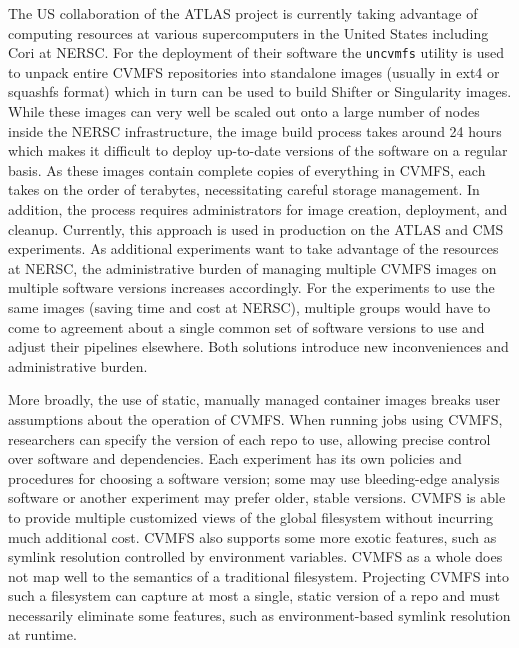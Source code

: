 \documentclass[sigconf]{acmart}
\begin{document}
The US collaboration of the ATLAS project is currently taking advantage of computing resources at various supercomputers in the United States including Cori at NERSC.
For the deployment of their software the \texttt{uncvmfs} utility is used to unpack entire CVMFS repositories into standalone images (usually in ext4 or squashfs format) which in turn can be used to build Shifter or Singularity images.
While these images can very well be scaled out onto a large number of nodes inside the NERSC infrastructure,
the image build process takes around 24 hours which makes it difficult to deploy up-to-date versions of the software on a regular basis.
As these images contain complete copies of everything in CVMFS,
each takes on the order of terabytes,
necessitating careful storage management.
In addition, the process requires administrators for image creation, deployment, and cleanup.
Currently, this approach is used in production on the ATLAS and CMS experiments.
As additional experiments want to take advantage of the resources at NERSC,
the administrative burden of managing multiple CVMFS images on multiple software versions increases accordingly.
For the experiments to use the same images (saving time and cost at NERSC),
multiple groups would have to come to agreement about a single common set of software versions to use and adjust their pipelines elsewhere.
Both solutions introduce new inconveniences and administrative burden.

More broadly, the use of static, manually managed container images breaks user assumptions about the operation of CVMFS.
When running jobs using CVMFS,
researchers can specify the version of each repo to use,
allowing precise control over software and dependencies.
Each experiment has its own policies and procedures for choosing a software version;
some may use bleeding-edge analysis software or another experiment may prefer older, stable versions.
CVMFS is able to provide multiple customized views of the global filesystem without incurring much additional cost.
CVMFS also supports some more exotic features,
such as symlink resolution controlled by environment variables.
CVMFS as a whole does not map well to the semantics of a traditional filesystem.
Projecting CVMFS into such a filesystem can capture at most a single, static version of a repo and must necessarily eliminate some features,
such as environment-based symlink resolution at runtime.
\end{document}
